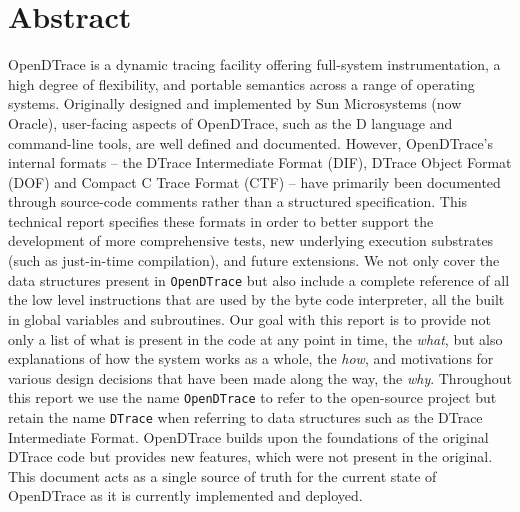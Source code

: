 \section*{Abstract}

OpenDTrace is a dynamic tracing facility offering full-system instrumentation,
a high degree of flexibility, and portable semantics across a range of
operating systems.
Originally designed and implemented by Sun Microsystems (now Oracle),
user-facing aspects of OpenDTrace, such as the D language and
command-line tools,
are well defined and documented.
However, OpenDTrace's internal formats --
the DTrace Intermediate Format (DIF),
DTrace Object Format (DOF) and Compact C Trace Format (CTF)
-- have primarily been documented through
source-code comments rather than a structured specification.
This technical report specifies these formats in order to better support the
development of more comprehensive tests, new underlying execution substrates
(such as just-in-time compilation), and future extensions.
We not only cover the data structures present in \texttt{OpenDTrace}
but also include a complete reference of all the low level
instructions that are used by the byte code interpreter,
all the built in global variables and subroutines.
Our goal with this report is to provide not only a list of
what is present in the code at any point in time, the \emph{what},
but also explanations of how the system works as a whole,
the \emph{how}, and motivations for various design decisions
that have been made along the way, the \emph{why}.
Throughout this report we use the name \texttt{OpenDTrace} to refer
to the open-source project but retain the name \texttt{DTrace} when
referring to data structures such as the DTrace Intermediate Format.
OpenDTrace builds upon the foundations of the original DTrace code but
provides new features, which were not present in the original.
This document acts as a single source of truth for the current state
of OpenDTrace as it is currently implemented and deployed.

